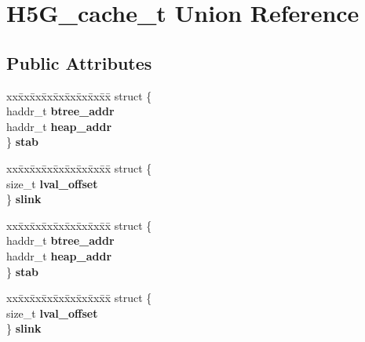 \hypertarget{union_h5_g__cache__t}{}\section{H5\+G\+\_\+cache\+\_\+t Union Reference}
\label{union_h5_g__cache__t}
\subsection*{Public Attributes}
\begin{DoxyCompactItemize}
\item 
\mbox{\label{union_h5_g__cache__t_a76259b8cff5f456227682f1b1e17c643}} 
\begin{tabbing}
xx\=xx\=xx\=xx\=xx\=xx\=xx\=xx\=xx\=\kill
struct \{\\
\>haddr\_t {\bfseries btree\_addr}\\
\>haddr\_t {\bfseries heap\_addr}\\
\} {\bfseries stab}\\

\end{tabbing}\item 
\mbox{\label{union_h5_g__cache__t_aefd38c16c5aeaf3289f1d7ecff08c3da}} 
\begin{tabbing}
xx\=xx\=xx\=xx\=xx\=xx\=xx\=xx\=xx\=\kill
struct \{\\
\>size\_t {\bfseries lval\_offset}\\
\} {\bfseries slink}\\

\end{tabbing}\item 
\mbox{\label{union_h5_g__cache__t_a8221c0356dd83241dd34e6d3e0e5814a}} 
\begin{tabbing}
xx\=xx\=xx\=xx\=xx\=xx\=xx\=xx\=xx\=\kill
struct \{\\
\>haddr\_t {\bfseries btree\_addr}\\
\>haddr\_t {\bfseries heap\_addr}\\
\} {\bfseries stab}\\

\end{tabbing}\item 
\mbox{\label{union_h5_g__cache__t_a2c7f81cd1f885ba791038cfe6e8d8f4a}} 
\begin{tabbing}
xx\=xx\=xx\=xx\=xx\=xx\=xx\=xx\=xx\=\kill
struct \{\\
\>size\_t {\bfseries lval\_offset}\\
\} {\bfseries slink}\\

\end{tabbing}\end{DoxyCompactItemize}


